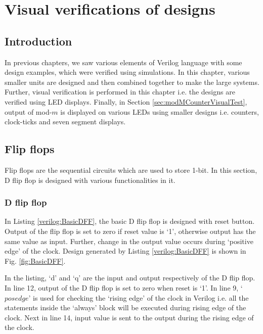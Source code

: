 \chapter{Visual verifications of designs} \label{ch:VisualVerification}

\graphicspath{{Chapters/VVD/Figures/}}


\section{Introduction}
In previous chapters, we saw various elements of Verilog language with some design examples, which were verified using simulations. In this chapter, various smaller units are designed and then combined together to make the large systems. Further, visual verification is performed in this chapter i.e. the designs are verified using LED displays. Finally, in Section \ref{sec:modMCounterVisualTest}, output of mod-$m$ is displayed on various LEDs using smaller designs i.e. counters, clock-ticks and seven segment displays. 

\section{Flip flops}
Flip flops are the sequential circuits which are used  to store 1-bit. In this section, D flip flop is designed with various functionalities in it.

\subsection{D flip flop}
In Listing \ref{verilog:BasicDFF}, the basic D flip flop is designed with reset button. Output of the flip flop is set to zero if reset value is `1', otherwise output has the same value as input. Further, change in the output value occurs during `positive edge' of the clock. Design generated by Listing \ref{verilog:BasicDFF} is shown in Fig. \ref{fig:BasicDFF}.

\begin{explanation} 
	In the listing, `d' and `q' are the input and output respectively of the D flip flop. In line 12, output of the D flip flop is set to zero when reset is `1'. In line 9, `$posedge$' is used for checking the `rising edge' of the clock in Verilog i.e. all the statements inside the `always' block will be executed during rising edge of the clock. Next in line 14, input value is sent to the output during the rising edge of the clock.
\end{explanation}


